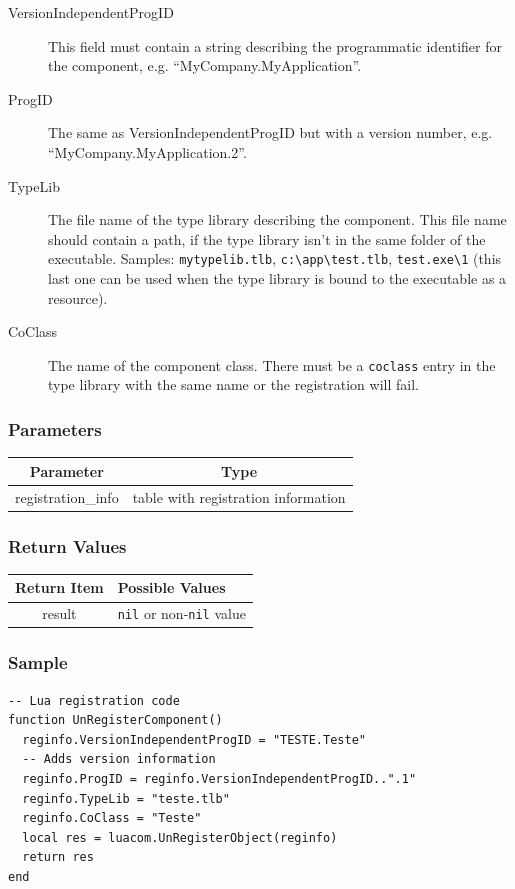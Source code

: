 \documentclass[11pt,a4paper,english]{report}
\begin{document}
\begin{description}
\item [VersionIndependentProgID] This field must contain a string
describing the programmatic identifier for the component,
e.g. ``MyCompany.MyApplication''.
\item [ProgID] The same as VersionIndependentProgID but with a version
number, e.g. ``MyCompany.MyApplication.2''.
\item [TypeLib] The file name of the type library describing the
component. This file name should contain a path, if the type library
isn't in the same folder of the executable. Samples:
\verb+mytypelib.tlb+, \verb+c:\app\test.tlb+, \verb+test.exe\1+ (this
last one can be used when the type library is bound to the executable
as a resource).
\item [CoClass] The name of the component class. There must be a
\texttt{coclass} entry in the type library with the same name or the
registration will fail.
\end{description}

\subsubsection*{Parameters}

\begin{tabular}{|c|c|}
\hline
\bf Parameter & \bf Type  \\ \hline \hline
registration\_info & table with registration information  \\ \hline
\end{tabular}

\subsubsection*{Return Values}

\begin{tabular}{|c|p{4cm}|}
\hline
\bf Return Item & \bf Possible Values \\ \hline \hline
result  & \texttt{nil} or non-\texttt{nil} value\\ \hline
\end{tabular}

\subsubsection*{Sample}

\begin{verbatim}
-- Lua registration code
function UnRegisterComponent()
  reginfo.VersionIndependentProgID = "TESTE.Teste"
  -- Adds version information
  reginfo.ProgID = reginfo.VersionIndependentProgID..".1"
  reginfo.TypeLib = "teste.tlb"
  reginfo.CoClass = "Teste"
  local res = luacom.UnRegisterObject(reginfo)
  return res
end
\end{verbatim}
\end{document}
